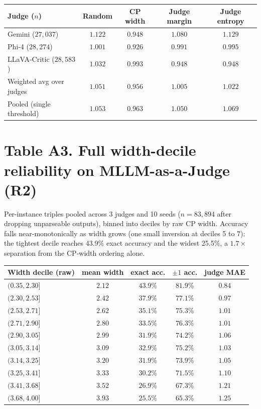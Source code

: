 \documentclass[11pt]{article}
\begin{document}
\begin{center}
\small
\begin{tabular}{lcccc}
\toprule
\textbf{Judge} ($n$) & \textbf{Random} & \textbf{CP width} & \textbf{Judge margin} & \textbf{Judge entropy} \\
\midrule
Gemini ($27{,}037$)       & $1.122$ & $\mathbf{0.948}$ & $1.080$ & $1.129$ \\
Phi-4 ($28{,}274$)        & $1.001$ & $\mathbf{0.926}$ & $0.991$ & $0.995$ \\
LLaVA-Critic ($28{,}583$) & $1.032$ & $0.993$ & $\mathbf{0.948}$ & $\mathbf{0.948}$ \\
\midrule
Weighted avg over judges  & $1.051$ & $0.956$ & $1.005$ & $1.022$ \\
Pooled (single threshold) & $1.053$ & $0.963$ & $1.050$ & $1.069$ \\
\bottomrule
\end{tabular}
\end{center}

\bigskip

\section*{Table A3. Full width-decile reliability on MLLM-as-a-Judge (R2)}

Per-instance triples pooled across 3 judges and 10 seeds ($n = 83{,}894$ after dropping
unparseable outputs), binned into deciles by raw CP width. Accuracy falls
near-monotonically as width grows (one small inversion at deciles 5 to 7): the tightest
decile reaches 43.9\% exact accuracy and the widest 25.5\%, a $1.7\times$ separation from
the CP-width ordering alone.

\begin{center}
\small
\begin{tabular}{lcccc}
\toprule
\textbf{Width decile (raw)} & \textbf{mean width} & \textbf{exact acc.} & $\pm 1$ \textbf{acc.} & \textbf{judge MAE} \\
\midrule
$(0.35, 2.30]$ & $2.12$ & $43.9\%$ & $81.9\%$ & $0.84$ \\
$(2.30, 2.53]$ & $2.42$ & $37.9\%$ & $77.1\%$ & $0.97$ \\
$(2.53, 2.71]$ & $2.62$ & $35.1\%$ & $75.3\%$ & $1.01$ \\
$(2.71, 2.90]$ & $2.80$ & $33.5\%$ & $76.3\%$ & $1.01$ \\
$(2.90, 3.05]$ & $2.99$ & $31.9\%$ & $74.2\%$ & $1.06$ \\
$(3.05, 3.14]$ & $3.09$ & $32.9\%$ & $75.2\%$ & $1.03$ \\
$(3.14, 3.25]$ & $3.20$ & $31.9\%$ & $73.9\%$ & $1.05$ \\
$(3.25, 3.41]$ & $3.33$ & $30.2\%$ & $71.5\%$ & $1.10$ \\
$(3.41, 3.68]$ & $3.52$ & $26.9\%$ & $67.3\%$ & $1.21$ \\
$(3.68, 4.00]$ & $3.93$ & $25.5\%$ & $65.3\%$ & $1.25$ \\
\bottomrule
\end{tabular}
\end{center}
\end{document}
